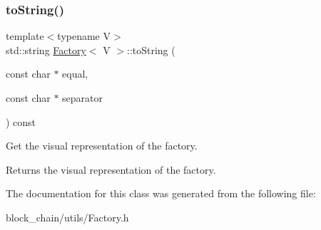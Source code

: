 \subsubsection{\texorpdfstring{to\+String()}{toString()}}
{\footnotesize\ttfamily template$<$typename V$>$ \\
std\+::string \mbox{\hyperlink{classFactory}{Factory}}$<$ V $>$\+::to\+String (\begin{DoxyParamCaption}\item[{const char $\ast$}]{equal,  }\item[{const char $\ast$}]{separator }\end{DoxyParamCaption}) const\hspace{0.3cm}{\ttfamily [inline]}}

Get the visual representation of the factory.

\begin{DoxyReturn}{Returns}
the visual representation of the factory. 
\end{DoxyReturn}


The documentation for this class was generated from the following file\+:\begin{DoxyCompactItemize}
\item 
block\+\_\+chain/utils/Factory.\+h\end{DoxyCompactItemize}
